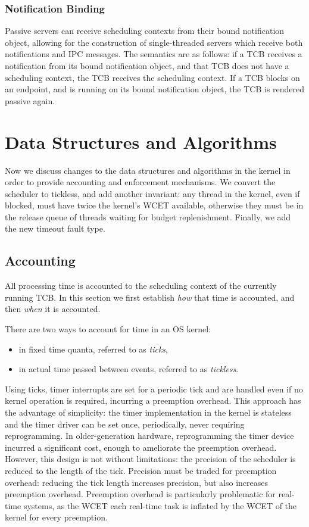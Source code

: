 \subsubsection{Notification Binding}

Passive servers can receive scheduling contexts from their bound notification object, allowing for
the construction of single-threaded servers which receive both notifications and IPC messages. 
The semantics are as follows: if a TCB receives a notification from its bound notification
object, and that TCB does not have a scheduling context, the TCB receives the scheduling context.
If a TCB blocks on an endpoint, and is running on its bound notification object, the TCB is
rendered passive again. 

\section{Data Structures and Algorithms}

Now we discuss changes to the data structures and algorithms in the kernel in order to provide
accounting and enforcement mechanisms. We convert the scheduler to tickless, and add another
invariant: any thread in the kernel, even if blocked, must have twice the kernel's WCET available,
otherwise they must be in the release queue of threads waiting for budget replenishment. Finally, we
add the new timeout fault type.

\subsection{Accounting}

All processing time is accounted to the scheduling context of the currently running \gls{TCB}. 
In this section we first establish \emph{how} that time is accounted, and then \emph{when} it is
accounted.

There are two ways to account for time in an \gls{OS} kernel:
\begin{itemize}
    \item in fixed time quanta, referred to as \emph{ticks},
    \item in actual time passed between events, referred to as \emph{tickless}.
\end{itemize}

Using ticks, timer interrupts are set for a periodic tick and are
handled even if no kernel operation is required, incurring a preemption overhead.
This approach has the advantage of simplicity: the timer implementation in the kernel is 
stateless and the timer driver can be set once, periodically, never requiring reprogramming. 
In older-generation hardware, reprogramming the timer device incurred a significant cost, enough to
ameliorate the preemption overhead. However, this design is not without limitations:
the precision of the scheduler is reduced to the length of the tick. Precision must be traded for
preemption overhead: reducing the tick length increases precision, but also increases 
preemption overhead. Preemption overhead is particularly problematic for real-time systems, as
the \gls{WCET} each real-time task is inflated by the \gls{WCET} of the kernel for every preemption.

